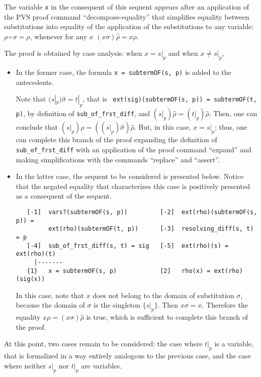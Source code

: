 \documentclass[submission,copyright,creativecommons]{eptcs}
\begin{document}
The variable {\tt x} in the consequent of this sequent appears after
an application of the PVS proof command ``decompose-equality'' that
simplifies equality between substitutions into equality of the
application of the substitutions to any variable: $\rho \circ \sigma =
\rho$, whenever for any $x$ $(x\sigma)\hat{\rho} = x\rho$.

The proof is obtained by case analysis: when $x = s|_p$ and when $x
\neq s|_p$,

\begin{itemize}
\item In the former case, the formula {\tt x = subtermOF(s, p)} is
  added to the antecedents.

  Note that $(s|_p)\hat{\sigma} = t|_p$, that is {\tt
    ext(sig)(subtermOF(s, p)) = subtermOF(t, p)}, by definition of
  {\tt sub\_of\_frst\_diff}, and $(s|_p)\hat{\rho} =
  (t|_p)\hat{\rho}$. Then, one can conclude that $(s|_p)\hat{\rho} =
  ((s|_p)\hat{\sigma})\hat{\rho}$. But, in this case, $x = s|_p$;
  thus, one can complete this branch of the proof expanding the
  definition of {\tt sub\_of\_frst\_diff} with an application of the
  proof command ``expand'' and making simplifications with the
  commands ``replace'' and ``assert''.

\item In the latter case, the sequent to be considered is presented
  below.  Notice that the negated equality that characterizes this
  case is positively presented as a consequent of the sequent.
             
  {\small
\begin{verbatim}
   [-1]  vars?(subtermOF(s, p))         [-2]  ext(rho)(subtermOF(s, p)) = 
         ext(rho)(subtermOF(t, p))      [-3]  resolving_diff(s, t) = p
   [-4]  sub_of_frst_diff(s, t) = sig   [-5]  ext(rho)(s) = ext(rho)(t)
     |-------
   {1}   x = subtermOF(s, p)            [2]   rho(x) = ext(rho)(sig(x))
\end{verbatim}
  }

  In this case, note that $x$ does not belong to the domain of
  substitution $\sigma$, because the domain of $\sigma$ is the
  singleton $\{s|_p\}$. Then $x\sigma = x$. Therefore the equality
  $x\rho = (x\sigma)\hat{\rho}$ is true, which is sufficient to
  complete this branch of the proof.
\end{itemize}

At this point, two cases remain to be considered: the case where
$t|_p$ is a variable, that is formalized in a way entirely analogous
to the previous case, and the case where neither $s|_p$ nor $t|_p$ are
variables.
\end{document}
